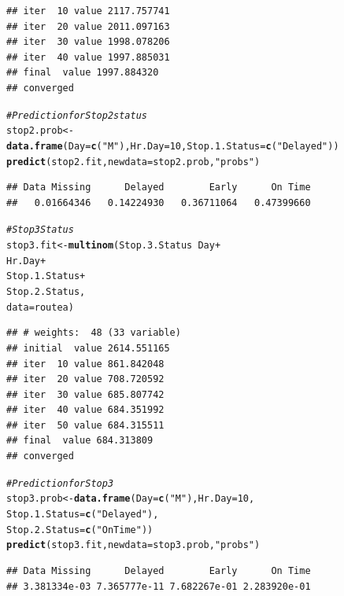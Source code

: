 \documentclass[12pt]{article}\usepackage[]{graphicx}\usepackage[]{color}
\makeatletter
\newcommand{\hlnum}[1]{\textcolor[rgb]{0.686,0.059,0.569}{#1}}%
\newcommand{\hlstr}[1]{\textcolor[rgb]{0.192,0.494,0.8}{#1}}%
\newcommand{\hlcom}[1]{\textcolor[rgb]{0.678,0.584,0.686}{\textit{#1}}}%
\newcommand{\hlopt}[1]{\textcolor[rgb]{0,0,0}{#1}}%
\newcommand{\hlstd}[1]{\textcolor[rgb]{0.345,0.345,0.345}{#1}}%
\newcommand{\hlkwb}[1]{\textcolor[rgb]{0.69,0.353,0.396}{#1}}%
\newcommand{\hlkwc}[1]{\textcolor[rgb]{0.333,0.667,0.333}{#1}}%
\newcommand{\hlkwd}[1]{\textcolor[rgb]{0.737,0.353,0.396}{\textbf{#1}}}%
\newenvironment{kframe}{%
 \def\at@end@of@kframe{}%
 \ifinner\ifhmode%
  \def\at@end@of@kframe{\end{minipage}}%
  \begin{minipage}{\columnwidth}%
 \fi\fi%
 \def\FrameCommand##1{\hskip\@totalleftmargin \hskip-\fboxsep
 \colorbox{shadecolor}{##1}\hskip-\fboxsep
     \hskip-\linewidth \hskip-\@totalleftmargin \hskip\columnwidth}%
 \MakeFramed {\advance\hsize-\width
   \@totalleftmargin\z@ \linewidth\hsize
   \@setminipage}}%
 {\par\unskip\endMakeFramed%
 \at@end@of@kframe}
\newenvironment{knitrout}{}{} %
\makeatother
\begin{document}
\begin{knitrout}
\begin{kframe}
\begin{verbatim}
## iter  10 value 2117.757741
## iter  20 value 2011.097163
## iter  30 value 1998.078206
## iter  40 value 1997.885031
## final  value 1997.884320 
## converged
\end{verbatim}
\begin{alltt}
\hlcom{#Prediction for Stop 2 status}
\hlstd{stop2.prob}\hlkwb{<-}\hlkwd{data.frame}\hlstd{(}\hlkwc{Day}\hlstd{=}\hlkwd{c}\hlstd{(}\hlstr{"M"}\hlstd{),}\hlkwc{Hr.Day}\hlstd{=}\hlnum{10}\hlstd{,}\hlkwc{Stop.1.Status}\hlstd{=}\hlkwd{c}\hlstd{(}\hlstr{"Delayed"}\hlstd{))}
\hlkwd{predict}\hlstd{(stop2.fit,}\hlkwc{newdata} \hlstd{= stop2.prob,}\hlstr{"probs"}\hlstd{)}
\end{alltt}
\begin{verbatim}
## Data Missing      Delayed        Early      On Time 
##   0.01664346   0.14224930   0.36711064   0.47399660
\end{verbatim}
\begin{alltt}
\hlcom{#Stop 3 Status}
\hlstd{stop3.fit}\hlkwb{<-}\hlkwd{multinom}\hlstd{(Stop.3.Status}\hlopt{~}\hlstd{Day}\hlopt{+}
                                                \hlstd{Hr.Day}\hlopt{+}
                                                \hlstd{Stop.1.Status}\hlopt{+}
                                                \hlstd{Stop.2.Status,}
                                        \hlkwc{data}\hlstd{=routea)}
\end{alltt}
\begin{verbatim}
## # weights:  48 (33 variable)
## initial  value 2614.551165 
## iter  10 value 861.842048
## iter  20 value 708.720592
## iter  30 value 685.807742
## iter  40 value 684.351992
## iter  50 value 684.315511
## final  value 684.313809 
## converged
\end{verbatim}
\begin{alltt}
\hlcom{#Prediction for Stop 3}
\hlstd{stop3.prob}\hlkwb{<-}\hlkwd{data.frame}\hlstd{(}\hlkwc{Day}\hlstd{=}\hlkwd{c}\hlstd{(}\hlstr{"M"}\hlstd{),}\hlkwc{Hr.Day}\hlstd{=}\hlnum{10}\hlstd{,}
                                           \hlkwc{Stop.1.Status}\hlstd{=}\hlkwd{c}\hlstd{(}\hlstr{"Delayed"}\hlstd{),}
                                           \hlkwc{Stop.2.Status}\hlstd{=}\hlkwd{c}\hlstd{(}\hlstr{"On Time"}\hlstd{))}
\hlkwd{predict}\hlstd{(stop3.fit,}\hlkwc{newdata} \hlstd{= stop3.prob,}\hlstr{"probs"}\hlstd{)}
\end{alltt}
\begin{verbatim}
## Data Missing      Delayed        Early      On Time 
## 3.381334e-03 7.365777e-11 7.682267e-01 2.283920e-01
\end{verbatim}

\end{kframe}
\end{knitrout}
\end{document}
